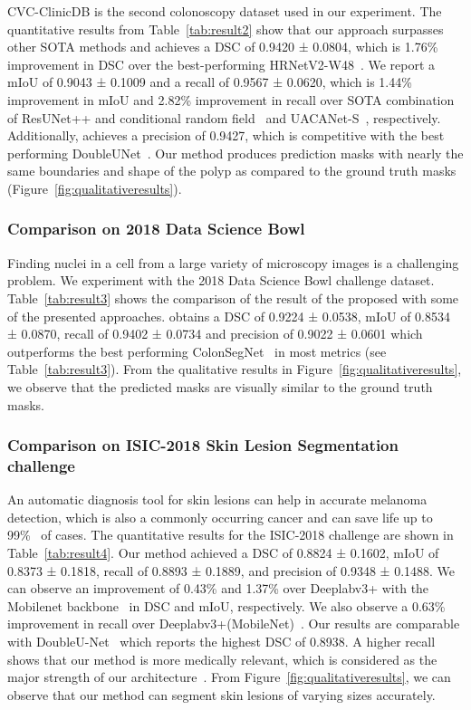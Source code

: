 \documentclass[journal,twoside,web]{IEEEtran}
\newcommand{\sysname}{\text{MSRF-Net}\xspace}
\begin{document}
CVC-ClinicDB is the second colonoscopy dataset used in our experiment. The quantitative results from Table~\ref{tab:result2} show that our approach surpasses other \ac{SOTA} methods and achieves a \ac{DSC} of 0.9420 ± 0.0804, which is 1.76\% improvement in \ac{DSC} over the best-performing HRNetV2-W48~\cite{Wang_2020}. We report a \ac{mIoU} of 0.9043  ± 0.1009 and a recall of 0.9567 ± 0.0620, which is 1.44\% improvement in \ac{mIoU} and 2.82\% improvement in recall over \ac{SOTA} combination of ResUNet++ and conditional random field~\cite{jha2021comprehensive} and UACANet-S~\cite{kim2021uacanet}, respectively. Additionally, \sysname achieves a precision of 0.9427, which is competitive with the best performing DoubleUNet~\cite{jha2020doubleu}. Our method produces prediction masks with nearly the same boundaries and shape of the polyp as compared to the ground truth masks (Figure~\ref{fig:qualitativeresults}). 

\subsubsection{Comparison on 2018 Data Science Bowl}
Finding nuclei in a cell from a large variety of microscopy images is a challenging problem. We experiment with the 2018 Data Science Bowl challenge dataset. Table~\ref{tab:result3} shows the comparison of the result of the proposed \sysname with some of the presented approaches. \sysname obtains a \ac{DSC} of 0.9224 ± 0.0538, \ac{mIoU} of 0.8534 ± 0.0870, recall of 0.9402 ± 0.0734 and precision of 0.9022 ± 0.0601 which outperforms the best performing ColonSegNet~\cite{jha2021real} in most metrics (see Table~\ref{tab:result3}). From the qualitative results in Figure~\ref{fig:qualitativeresults}, we observe that the predicted masks are visually similar to the ground truth masks. 
\subsubsection{Comparison on ISIC-2018 Skin Lesion Segmentation challenge}
An automatic diagnosis tool for skin lesions can help in accurate melanoma detection, which is also a commonly occurring cancer and can save life up to 99\%~\cite{cancerfigures} of cases. The quantitative results for the ISIC-2018 challenge are shown in Table~\ref{tab:result4}. Our method achieved a \ac{DSC} of 0.8824 ± 0.1602, \ac{mIoU} of 0.8373 ± 0.1818, recall of 0.8893 ± 0.1889, and precision of 0.9348 ± 0.1488. We can observe an improvement of 0.43\% and 1.37\% over Deeplabv3+ with the Mobilenet backbone~\cite{chen2017deeplab} in \ac{DSC} and \ac{mIoU}, respectively. We also observe a 0.63\% improvement in recall over Deeplabv3+(MobileNet)~\cite{chen2017deeplab}. Our results are comparable with DoubleU-Net~\cite{jha2020doubleu} which reports the highest \ac{DSC} of 0.8938. A higher recall shows that our method is more medically relevant, which is considered as the major strength of our architecture~\cite{gilvary2019missing}. From Figure~\ref{fig:qualitativeresults}, we can observe that our method can segment skin lesions of varying sizes accurately.
\vspace{-0.3cm}
\end{document}
